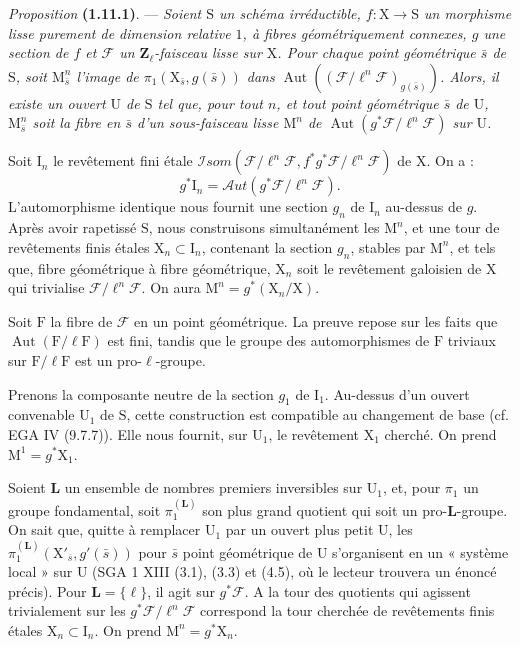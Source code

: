 \documentclass[11pt,leqno]{article}
\begin{document}
\textit{Proposition} \textbf{(1.11.1)}. — \textit{Soient \(\mathrm{S}\) un schéma irréductible, \(f:\mathrm{X}\to\mathrm{S}\) un morphisme lisse purement de dimension relative \(1\), à fibres géométriquement connexes, \(g\) une section de \(f\) et \(\mathscr{F}\) un \(\mathbf{Z}_\ell\)-faisceau lisse sur \(\mathrm{X}\). Pour chaque point géométrique \(\bar{s}\) de \(\mathrm{S}\), soit \(\mathrm{M}_{\bar{s}}^n\) l’image de \(\pi_1(\mathrm{X}_{\bar{s}},g(\bar{s}))\) dans \(\operatorname{Aut}((\mathscr{F}/\ell^n\mathscr{F})_{g(\bar{s})})\). Alors, il existe un ouvert \(\mathrm{U}\) de \(\mathrm{S}\) tel que, pour tout \(n\), et tout point géométrique \(\bar{s}\) de \(\mathrm{U}\), \(\mathrm{M}_{\bar{s}}^n\) soit la fibre en \(\bar{s}\) d’un sous-faisceau lisse \(\mathrm{M}^n\) de \(\operatorname{Aut}(g^*\mathscr{F}/\ell^n\mathscr{F})\) sur \(\mathrm{U}\).}

Soit \(\mathrm{I}_n\) le revêtement fini étale \(\mathscr{I}\!som(\mathscr{F}/\ell^n\mathscr{F},f^*g^*\mathscr{F}/\ell^n\mathscr{F})\) de \(\mathrm{X}\). On a :
\[
g^*\mathrm{I}_n=\mathscr{A}\!ut(g^*\mathscr{F}/\ell^n\mathscr{F}).
\]
L’automorphisme identique nous fournit une section \(g_n\) de \(\mathrm{I}_n\) au-dessus de \(g\). Après avoir rapetissé \(\mathrm{S}\), nous construisons simultanément les \(\mathrm{M}^n\), et une tour de revêtements finis étales \(\mathrm{X}_n\subset\mathrm{I}_n\), contenant la section \(g_n\), stables par \(\mathrm{M}^n\), et tels que, fibre géométrique à fibre géométrique, \(\mathrm{X}_n\) soit le revêtement galoisien de \(\mathrm{X}\) qui trivialise \(\mathscr{F}/\ell^n\mathscr{F}\). On aura \(\mathrm{M}^n=g^*(\mathrm{X}_n/\mathrm{X})\).

Soit \(\mathrm{F}\) la fibre de \(\mathscr{F}\) en un point géométrique. La preuve repose sur les faits que \(\operatorname{Aut}(\mathrm{F}/\ell\mathrm{F})\) est fini, tandis que le groupe des automorphismes de \(\mathrm{F}\) triviaux sur \(\mathrm{F}/\ell\mathrm{F}\) est un pro-\(\ell\)-groupe.

Prenons la composante neutre de la section \(g_1\) de \(\mathrm{I}_1\). Au-dessus d’un ouvert convenable \(\mathrm{U}_1\) de \(\mathrm{S}\), cette construction est compatible au changement de base (cf. EGA IV (9.7.7)). Elle nous fournit, sur \(\mathrm{U}_1\), le revêtement \(\mathrm{X}_1\) cherché. On prend \(\mathrm{M}^1=g^*\mathrm{X}_1\).

Soient \(\mathbf{L}\) un ensemble de nombres premiers inversibles sur \(\mathrm{U}_1\), et, pour \(\pi_1\) un groupe fondamental, soit \(\pi_1^{(\mathbf{L})}\) son plus grand quotient qui soit un pro-\(\mathbf{L}\)-groupe. On sait que, quitte à remplacer \(\mathrm{U}_1\) par un ouvert plus petit \(\mathrm{U}\), les \(\pi_1^{(\mathbf{L})}(\mathrm{X}'_{\bar{s}},g'(\bar{s}))\) pour \(\bar{s}\) point géométrique de \(\mathrm{U}\) s’organisent en un « système local » sur \(\mathrm{U}\) (SGA 1 XIII (3.1), (3.3) et (4.5), où le lecteur trouvera un énoncé précis). Pour \(\mathbf{L}=\{\ell\}\), il agit sur \(g^*\mathscr{F}\). A la tour des quotients qui agissent trivialement sur les \(g^*\mathscr{F}/\ell^n\mathscr{F}\) correspond la tour cherchée de revêtements finis étales \(\mathrm{X}_n\subset\mathrm{I}_n\). On prend \(\mathrm{M}^n=g^*\mathrm{X}_n\).
\end{document}
